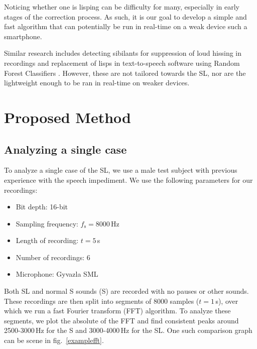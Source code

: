 \documentclass{IEEEtran}
\begin{document}
Noticing whether one is lisping can be difficulty for many,
especially in early stages of the correction process.
As such,
it is our goal to develop a simple and fast algorithm that can potentially be run in real-time on a weak device such a smartphone.

Similar research includes detecting sibilants for suppression of loud hissing in recordings \cite{Gonzalez} \cite{de-ess} and replacement of lisps in text-to-speech software using Random Forest Classifiers \cite{Itagi}.
However,
these are not tailored towards the SL,
nor are the lightweight enough to be ran in real-time on weaker devices.

\section{Proposed Method}

\subsection{Analyzing a single case}\label{analyze}

To analyze a single case of the SL,
we use a male test subject with previous experience with the speech impediment.
We use the following parameters for our recordings:

\begin{itemize}
	\item Bit depth: 16-bit
	\item Sampling frequency: \(f_\mathrm{s} = 8000\)\,Hz
	\item Length of recording: \(t = 5\)\,s
	\item Number of recordings: 6
	\item Microphone: Gyvazla SML
\end{itemize}

Both SL and normal S sounds (S) are recorded with no pauses or other sounds.
These recordings are then split into segments of 8000 samples (\(t = 1\)\,s),
over which we run a fast Fourier transform (FFT) algorithm.
To analyze these segments, we plot the absolute of the FFT and find consistent peaks around 2500-3000\,Hz for the S and 3000-4000\,Hz for the SL.
One such comparison graph can be scene in fig.\ \ref{examplefft}.
\end{document}
